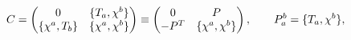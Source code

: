 \begin{equation}
C=\left(\begin{matrix} 0&\{T_a,\chi^b\} \\ \{\chi^a,T_b\}& \{\chi^a,\chi^b\}
  \end{matrix}\right)
 \equiv
\left(\begin{matrix} 0&P \\ -P\sp{T}& \{\chi^a,\chi^b\}
  \end{matrix}\right),
\qquad
P^b_a=\{T_a,\chi^b\},
\label{P}
\end{equation}

